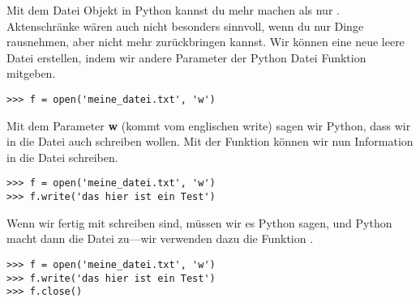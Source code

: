 Mit dem Datei Objekt in Python kannst du mehr machen als nur . Aktenschränke wären auch nicht besonders sinnvoll, wenn du nur Dinge rausnehmen, aber nicht mehr zurückbringen kannst. Wir können eine neue leere Datei erstellen, indem wir andere Parameter der Python Datei Funktion mitgeben.

\begin{Verbatim}[frame=single]
>>> f = open('meine_datei.txt', 'w')
\end{Verbatim}

Mit dem Parameter \textbf{w} (kommt vom englischen write) sagen wir Python, dass wir in die Datei auch schreiben wollen. Mit der Funktion  können wir nun Information in die Datei schreiben.

\begin{Verbatim}[frame=single]
>>> f = open('meine_datei.txt', 'w')
>>> f.write('das hier ist ein Test')
\end{Verbatim}

Wenn wir fertig mit schreiben sind, müssen wir es Python sagen, und Python macht dann die Datei zu---wir verwenden dazu die Funktion .

\begin{Verbatim}[frame=single, label= alle Befehle zusammengefasst]
>>> f = open('meine_datei.txt', 'w')
>>> f.write('das hier ist ein Test')
>>> f.close()
\end{Verbatim}

